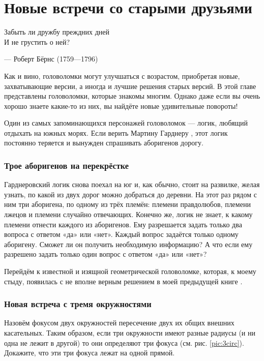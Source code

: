 \chapter{Новые встречи со старыми друзьями}

\setlength{\epigraphwidth}{.53\textwidth}
\epigraph{Забыть ли дружбу преждних дней\\
И не грустить о ней?}{--- Роберт Бёрнс (1759---1796)}

Как и вино, головоломки могут улучшаться с возрастом, приобретая новые, захватывающие версии, а иногда и лучшие решения старых версий.
В этой главе представлены головоломки, которые знакомы многим.
Однако даже если вы очень хорошо знаете какие-то из них, 
вы найдёте новые удивительные повороты!

Один из самых запоминающихся персонажей головоломок --- логик, любящий отдыхать на южных морях.
Если верить Мартину Гарднеру \cite{27}, этот логик постоянно теряется и вынужден спрашивать аборигенов дорогу.

\subsection*{Трое аборигенов на перекрёстке}

Гарднеровский логик снова поехал на юг и, как обычно, стоит на развилке, желая узнать, по какой из двух дорог можно добраться до деревни.
На этот раз рядом с ним три аборигена, по одному из трёх племён:
племени правдолюбов,
племени лжецов
и племени случайно отвечающих.
Конечно же, логик не знает, к какому племени отнести каждого из аборигенов.
Ему разрешается задать только два вопроса с ответом «да» или «нет».
Каждый вопрос задаётся только одному аборигену.
Сможет ли он получить необходимую информацию?
А что если ему разрешено задать только один вопрос с ответом «да» или «нет»?

\medskip

Перейдём к известной и изящной геометрической головоломке, которая, к моему стыду, появилась с не вполне верным решением в моей предыдущей книге \cite{59}.

\subsection*{Новая встреча с тремя окружностями}

Назовём фокусом двух окружностей пересечение двух их общих внешних касательных.
Таким образом, если три окружности имеют разные радиусы (и ни одна не лежит в другой) то они определяют три фокуса (см. рис. \ref{pic:3circ}).
Докажите, что эти три фокуса лежат на одной прямой.

